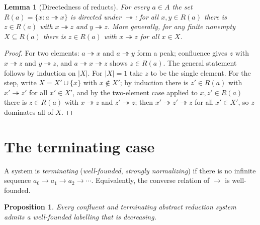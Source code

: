 \documentclass{amsart}
\newtheorem{lemma}{Lemma}
\newtheorem{proposition}{Proposition}
\theoremstyle{definition}
\theoremstyle{remark}
\newcommand{\redto}{\rightarrow}
\newcommand{\redtt}{\twoheadrightarrow}
\begin{document}
\begin{lemma}[Directedness of reducts]\label{lem:dir}
For every $a\in A$ the set $R(a)=\{x: a\redtt x\}$ is directed under $\redtt$:
for all $x,y\in R(a)$ there is $z\in R(a)$ with $x\redtt z$ and $y\redtt z$.
More generally, for any finite nonempty $X\subseteq R(a)$ there is $z\in R(a)$
with $x\redtt z$ for all $x\in X$.
\end{lemma}

\begin{proof}
For two elements: $a\redtt x$ and $a\redtt y$ form a peak; confluence gives $z$
with $x\redtt z$ and $y\redtt z$, and $a\redtt x\redtt z$ shows $z\in R(a)$.
The general statement follows by induction on $|X|$.  For $|X|=1$ take $z$ to be
the single element.  For the step, write $X=X'\cup\{x\}$ with $x\notin X'$; by
induction there is $z'\in R(a)$ with $x'\redtt z'$ for all $x'\in X'$, and by the
two-element case applied to $x,z'\in R(a)$ there is $z\in R(a)$ with $x\redtt z$
and $z'\redtt z$; then $x'\redtt z'\redtt z$ for all $x'\in X'$, so $z$
dominates all of $X$.
\end{proof}

\section{The terminating case}\label{sec:term}

A system is \emph{terminating} (\emph{well-founded}, \emph{strongly
normalizing}) if there is no infinite sequence $a_0\redto a_1\redto a_2\redto
\cdots$.  Equivalently, the converse relation of $\redto$ is well-founded.

\begin{proposition}\label{prop:term}
Every confluent and terminating abstract reduction system admits a well-founded
labelling that is decreasing.
\end{proposition}
\end{document}
